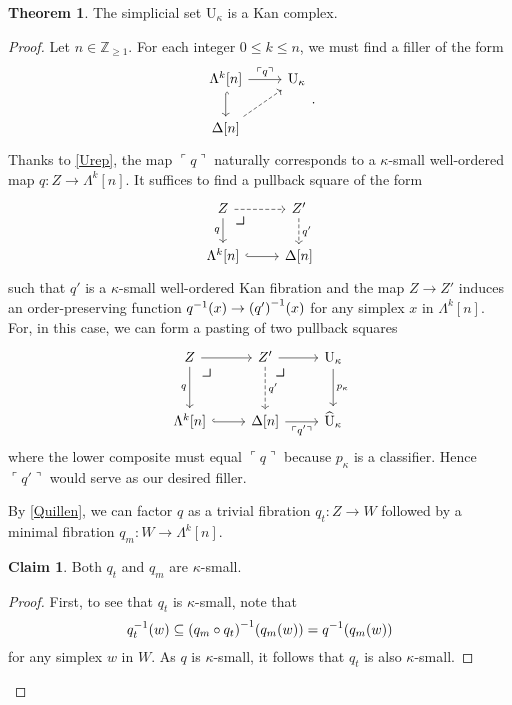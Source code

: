 \documentclass[10pt,letterpaper,cm]{nupset}
\theoremstyle{definition}
\theoremstyle{theorem}
\newtheorem{theorem}[definition]{Theorem}
\newtheorem*{claim}{Claim}
\theoremstyle{remark}
\newcommand{\Z}{\mathbb Z}
\newcommand{\0}{\mathbf{0}}
\newcommand{\1}{\mathbf{1}}
\newcommand{\2}{\mathbf{2}}
\begin{document}
\begin{theorem}\label{UKan}
The simplicial set $\mathrm{U}_{\kappa}$ is a Kan complex.
\end{theorem}
\begin{proof}
Let $n\in \Z_{\geq 1}$. For each integer $0\leq k \leq n$, we must find a filler of the form
\[
\begin{tikzcd}
{\Lambda^k[n]} \arrow[d, hook] \arrow[r, "\ulcorner{q}\urcorner"] & \mathrm{U}_{\kappa} \\
{\Delta[n]} \arrow[ru, dashed]                                    &                    
\end{tikzcd}
.\] Thanks to \cref{Urep}, the map $\ulcorner{q}\urcorner$ naturally corresponds to a $\kappa$-small well-ordered map $q : Z\to \Lambda^k[n]$. It suffices to find a pullback square of the form
\[
\begin{tikzcd}
Z \arrow[r, dashed] \arrow[d, "q"'] 
\arrow[dr, phantom, "\scalebox{1.5}{\color{black}$\lrcorner$}" , very near start, color=black]
& Z' \arrow[d, "q'", dashed] \\
{\Lambda^k[n]} \arrow[r, hook]      & {\Delta[n]}               
\end{tikzcd}
\] such that  $q'$ is a $\kappa$-small well-ordered Kan fibration and the map $Z \to Z'$  induces an order-preserving function  $q^{-1}(x) \to \mleft(q'\mright)^{-1}(x)$ for any simplex $x$ in $\Lambda^k[n]$. For, in this case, we can form a pasting of two pullback squares
\[
\begin{tikzcd}[row sep=large]
Z \arrow[d, "q"'] \arrow[r]    
\arrow[dr, phantom, "\scalebox{1.5}{\color{black}$\lrcorner$}" , very near start, color=black] & Z' \arrow[d, "q'", dashed] \arrow[r]             
\arrow[dr, phantom, "\scalebox{1.5}{\color{black}$\lrcorner$}" , very near start, color=black]
& \mathrm{U}_{\kappa} \arrow[d, "p_{\kappa}"] \\
{\Lambda^k[n]} \arrow[r, hook] & {\Delta[n]} \arrow[r, "\ulcorner{q'}\urcorner"'] & \widehat{\mathrm{U}}_{\kappa}              
\end{tikzcd}
\] where the lower composite must equal $\ulcorner{q}\urcorner$ because $p_{\kappa}$ is a classifier. Hence $\ulcorner{q'}\urcorner$ would serve as our desired filler. 

\medskip

By \cref{Quillen}, we can factor $q$  as a trivial fibration $q_t :Z \to W$ followed by a minimal fibration $q_m: W \to \Lambda^k[n]$.
\begin{claim}
Both  $q_t$ and $q_m$ are $\kappa$-small.
\end{claim}
\begin{proof}
First, to see that $q_t$ is $\kappa$-small, note that
\[
q_{t}^{-1}(w) \subseteq\mleft(q_{m} \circ q_{t}\mright)^{-1}\mleft(q_{m}(w)\mright)=q^{-1}\mleft(q_{m}(w)\mright)
\] for any simplex $w$ in $W$. As $q$ is $\kappa$-small, it follows that $q_t$ is also $\kappa$-small.


\end{proof}
\end{proof}
\end{document}

